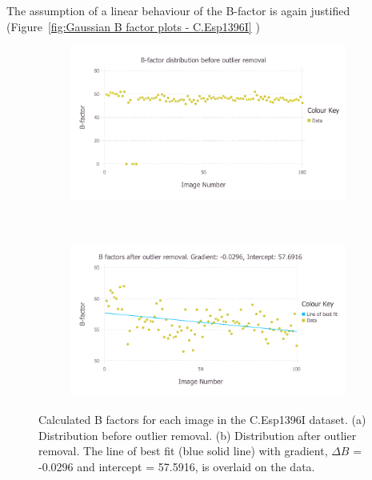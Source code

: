 The assumption of a linear behaviour of the B-factor is again justified (Figure~\ref{fig:Gaussian B factor plots - C.Esp1396I} )
\begin{figure}
    \centering
    \begin{subfigure}[b]{1.0\textwidth}
            \centering
            \includegraphics[width=\textwidth]{figures/datared/BFac_Plot_Before_outlier_removal_cprot.pdf}
            \caption{}
            \label{fig:B factors per image before outlier removal - C.Esp1396I}
    \end{subfigure}
    \\
    \begin{subfigure}[b]{1.0\textwidth}
            \centering
            \includegraphics[width=\textwidth]{figures/datared/BFac_Plot_After_outlier_removal_cprot.pdf}
            \caption{}
            \label{fig:B factors per image after outlier removal - C.Esp1396I}
    \end{subfigure}
    \caption{Calculated B factors for each image in the C.Esp1396I dataset.
    (a) Distribution before outlier removal.
    (b) Distribution after outlier removal.
    The line of best fit (blue solid line) with gradient, $\Delta B$ = -0.0296 and intercept = 57.5916, is overlaid on the data.}
    \label{fig:B factors per image - C.Esp1396I}
\end{figure}

